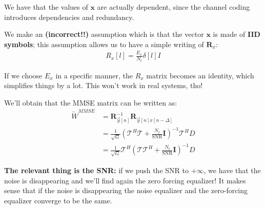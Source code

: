 \documentclass[a4paper, 12pt]{book}
\begin{document}
We have that the values of $\mathbf{x}$ are actually dependent, since the channel coding introduces dependencies and redundancy.

We make an \textbf{(incorrect!!)} assumption which is that the vector $\mathbf{x}$ is made of \textbf{IID symbols}; this assumption allows us to have a simple writing of $\mathbf{R}_x$:
\begin{align}
    R_x[l] = \frac{E_x}{N_t} \delta[l] I
\end{align}

If we choose $E_x$ in a specific manner, the $R_x$ matrix becomes an identity, which simplifies things by a lot.
This won't work in real systems, tho!

We'll obtain that the MMSE matrix can be written as:
\begin{align}
    \tilde{W}^{MMSE} &= \mathbf{R}_{\vec{y}[n]}^{-1} \mathbf{R}_{\vec{y}[n]x[n-\Delta]} \\
    &= \frac{1}{\sqrt{G}} \left( \mathcal{T}^H \mathcal{T} + \frac{N_t}{\text{SNR}} \mathbf{I} \right)^{-1} \mathcal{T}^H D \\
    &= \frac{1}{\sqrt{G}} \mathcal{T}^H \left( \mathcal{T} \mathcal{T}^H + \frac{N_t}{\text{SNR}} \mathbf{I} \right)^{-1} D
\end{align}

\textbf{The relevant thing is the SNR:} if we push the SNR to $+\infty$, we have that the noise is disappearing and we'll find again the zero forcing equalizer!
It makes sense that if the noise is disappearing the noise equalizer and the zero-forcing equalizer converge to be the same.
\end{document}
